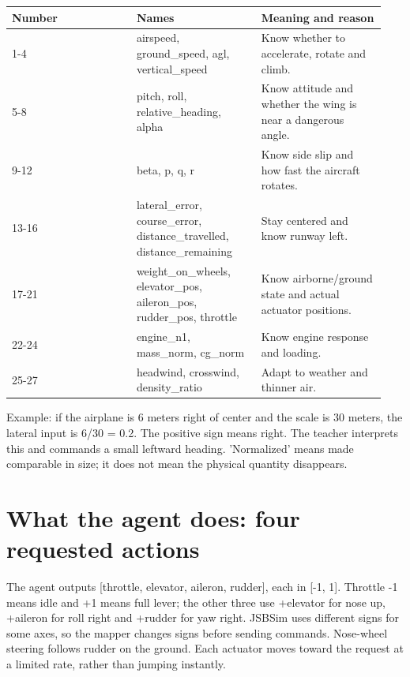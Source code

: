 \documentclass[11pt,a4paper]{article}
\begin{document}
\begin{longtable}{|p{0.313\linewidth}|p{0.313\linewidth}|p{0.313\linewidth}|}\hline
Number & Names & Meaning and reason \\ \hline
1-4 & airspeed, ground\_speed, agl, vertical\_speed & Know whether to accelerate, rotate and climb. \\ \hline
5-8 & pitch, roll, relative\_heading, alpha & Know attitude and whether the wing is near a dangerous angle. \\ \hline
9-12 & beta, p, q, r & Know side slip and how fast the aircraft rotates. \\ \hline
13-16 & lateral\_error, course\_error, distance\_travelled, distance\_remaining & Stay centered and know runway left. \\ \hline
17-21 & weight\_on\_wheels, elevator\_pos, aileron\_pos, rudder\_pos, throttle & Know airborne/ground state and actual actuator positions. \\ \hline
22-24 & engine\_n1, mass\_norm, cg\_norm & Know engine response and loading. \\ \hline
25-27 & headwind, crosswind, density\_ratio & Adapt to weather and thinner air. \\ \hline
\end{longtable}
Example: if the airplane is 6 meters right of center and the scale is 30 meters, the lateral input is 6/30 = 0.2. The positive sign means right. The teacher interprets this and commands a small leftward heading. 'Normalized' means made comparable in size; it does not mean the physical quantity disappears.

\section{What the agent does: four requested actions}
The agent outputs [throttle, elevator, aileron, rudder], each in [-1, 1]. Throttle -1 means idle and +1 means full lever; the other three use +elevator for nose up, +aileron for roll right and +rudder for yaw right. JSBSim uses different signs for some axes, so the mapper changes signs before sending commands. Nose-wheel steering follows rudder on the ground. Each actuator moves toward the request at a limited rate, rather than jumping instantly.
\end{document}
